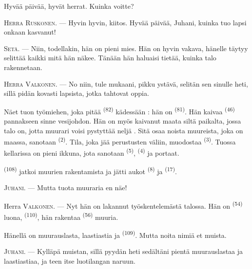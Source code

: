 Hyvää päivää, hyvät herrat. Kuinka voitte?

\textsc{Herra Ruskonen}. --- Hyvin hyvin, kiitos. Hyvää päivää, Juhani, kuinka
tuo lapsi onkaan kasvanut!

\textsc{Setä}. --- Niin, todellakin, hän on pieni mies. Hän on hyvin vakava,
hänelle täytyy selittää kaikki mitä hän näkee. Tänään hän haluaisi tietää,
kuinka talo rakennetaan.

\VUsaut{3.0mm}

\textsc{Herra Valkonen}. --- No niin, tule mukaani, pikku ystävä, selitän sen
sinulle heti, sillä pidän kovasti lapsista, jotka tahtovat oppia.

Näet tuon työmiehen, joka pitää  \textsuperscript{(82)}
kädessään : hän on  \textsuperscript{(81)}. Hän kaivaa
 \textsuperscript{(46)} pannakseen sinne vesijohdon. Hän on myös
kaivanut maata siltä paikalta, jossa talo on, jotta muurari voisi pystyttää
neljä . Sitä osaa noista muureista, joka on maassa, sanotaan
 \textsuperscript{(2)}. Tila, joka jää perustusten väliin,
muodostaa  \textsuperscript{(3)}. Tuossa kellarissa on pieni
ikkuna, jota sanotaan  \textsuperscript{(5)},
 \textsuperscript{(4)} ja portaat.

 \textsuperscript{(108)} jatkoi muurien rakentamista ja jätti
aukot  \textsuperscript{(8)} ja 
\textsuperscript{(17)}.

\textsc{Juhani}. --- Mutta tuota muuraria en näe!

Herra \textsc{Valkonen}. --- Nyt hän on lakannut työskentelemästä talossa. Hän
on  \textsuperscript{(54)} luona, 
\textsuperscript{(110)}, hän rakentaa 
\textsuperscript{(56)} muuria.

Hänellä on muurauslasta, laastiastia ja 
\textsuperscript{(109)}. Mutta noita nimiä et muista.

\textsc{Juhani}. --- Kylläpä muistan, sillä pyydän heti sedältäni pientä
muurauslastaa ja laastiastiaa, ja teen itse luotilangan naruun.

\VUsaut{3.0mm}
\VUsaut{3.0mm}


